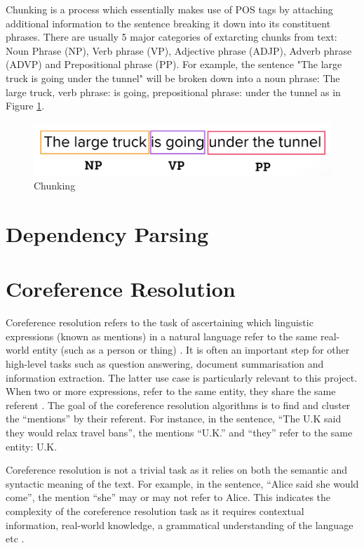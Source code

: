 Chunking is a process which essentially makes use of POS tags by attaching additional information to the sentence breaking it down into its constituent phrases. There are usually 5 major categories of extarcting chunks from text: Noun Phrase (NP), Verb phrase (VP), Adjective phrase (ADJP), Adverb phrase (ADVP) and Prepositional phrase (PP). 
For example, the sentence "The large truck is going under the tunnel" will be broken down into a noun phrase: The large truck, verb phrase: is going, prepositional phrase: under the tunnel as in Figure \ref{fig:chunking}.

\begin{figure}[H]
\centering
\includegraphics[scale=0.35]{images/chunking.png}
\caption{Chunking}
\label{fig:chunking}
\end{figure}



\section{Dependency Parsing}


\section{Coreference Resolution}

Coreference resolution refers to the task of ascertaining which linguistic expressions (known as mentions) in a natural language refer to the same real-world entity (such as a person or thing) \cite{zheng2011coreference}. It is often an important step for other high-level tasks such as question answering, document summarisation and information extraction. The latter use case is particularly relevant to this project. When two or more expressions, refer to the same entity, they share the same referent \cite{wiki_coref}. The goal of the coreference resolution algorithms is to find and cluster the “mentions” by their referent. For instance, in the sentence, “The U.K said they would relax travel bans”, the mentions “U.K.” and “they” refer to the same entity: U.K. 

Coreference resolution is not a trivial task as it relies on both the semantic and syntactic meaning of the text. For example, in the sentence, “Alice said she would come”, the mention “she” may or may not refer to Alice.  This indicates the complexity of the coreference resolution task as it requires contextual information, real-world knowledge, a grammatical understanding of the language etc \cite{zheng2011coreference}.

